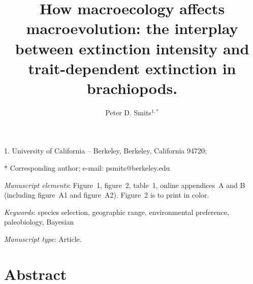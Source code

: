 \documentclass[11pt]{article}
\title{How macroecology affects macroevolution: the interplay between extinction intensity and trait-dependent extinction in brachiopods.}
\author{Peter D. Smits$^{1,\ast}$}
\date{}
\begin{document}
\maketitle

\noindent{} 1. University of California -- Berkeley, Berkeley, California 94720;

\noindent{} $\ast$ Corresponding author; e-mail: psmits@berkeley.edu

\bigskip

\textit{Manuscript elements}: Figure~1, figure~2, table~1, online appendices~A and B (including figure~A1 and figure~A2). Figure~2 is to print in color.

\bigskip

\textit{Keywords}: species selection, geographic range, environmental preference, paleobiology, Bayesian

\bigskip

\textit{Manuscript type}: Article. %

\bigskip


\linenumbers{}
\modulolinenumbers[3]

\newpage{}

\section*{Abstract}
\end{document}
